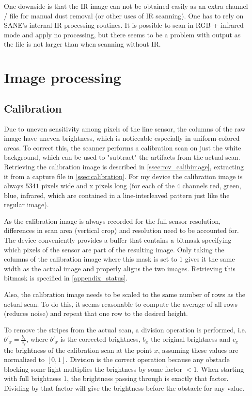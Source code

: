 \documentclass{article}
\begin{document}
One downside is that the IR image can not be obtained easily as an extra channel
/ file for manual dust removal (or other uses of IR scanning). One has to rely
on SANE's internal IR processing routines. It is possible to scan in RGB + infrared
mode and apply no processing, but there seems to be a problem with output as the
file is not larger than when scanning without IR.

\section{Image processing}
\label{sec:imgproc}

\subsection{Calibration}
\label{ssec:imgproc_calib}

Due to uneven sensitivity among pixels of the line sensor, the columns of the raw image
have uneven brightness, which is noticeable especially in uniform-colored areas.
To correct this, the scanner performs a calibration scan on just the white background,
which can be used to "subtract" the artifacts from the actual scan.
Retrieving the calibration image is described in \autoref{ssec:rcv_calibimage}, extracting it
from a capture file in \autoref{ssec:calibration}. For my device the calibration image is always
$5341$ pixels wide and x pixels long (for each of the 4 channels red, green, blue, infrared,
which are contained in a line-interleaved pattern just like the regular image).

As the calibration image is always recorded for the full sensor resolution, differences in
scan area (vertical crop) and resolution need to be accounted for. The device conveniently
provides a buffer that contains a bitmask specifying which pixels of the sensor are part of the
resulting image. Only taking the columns of the calibration image where this mask is set to 1
gives it the same width as the actual image and properly aligns the two images.
Retrieving this bitmask is specified in \autoref{appendix_status}.

Also, the calibration image needs to be scaled to the same number of rows as the actual scan.
To do this, it seems reasonable to compute the average of all rows (reduces noise) and repeat
that one row to the desired height.

To remove the stripes from the actual scan, a division operation is performed, i.e.
$b'_{x} = \frac{b_{x}}{c_{x}}$, where $b'_{x}$ is the corrected brightness, $b_x$
the original brightness and $c_{x}$ the brightness of the calibration scan at the point $x$,
assuming these values are normalized to $[0, 1]$. Division is the correct operation because
any obstacle blocking some light multiplies the brightness by some factor $< 1$. When
starting with full brightness 1, the brightness passing through is exactly that factor.
Dividing by that factor will give the brightness before the obstacle for any value.
\end{document}
